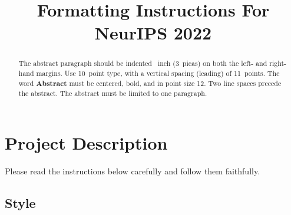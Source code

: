 \documentclass{article}
\title{Formatting Instructions For NeurIPS 2022}
\begin{document}
\maketitle


\begin{abstract}
  The abstract paragraph should be indented ~inch (3~picas) on
  both the left- and right-hand margins. Use 10~point type, with a vertical
  spacing (leading) of 11~points.  The word \textbf{Abstract} must be centered,
  bold, and in point size 12. Two line spaces precede the abstract. The abstract
  must be limited to one paragraph.
\end{abstract}


\section{Project Description}


Please read the instructions below carefully and follow them faithfully.


\subsection{Style}
\end{document}
